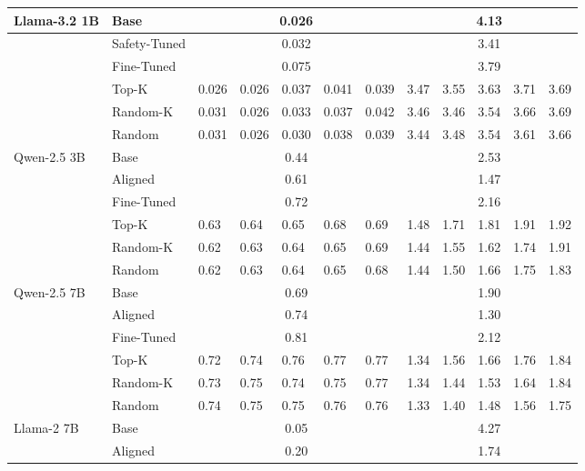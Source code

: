 \documentclass[10pt]{article}
\begin{document}
\begin{table}[h]
\begin{center}
\begin{tabular}{|l|l|l|l|l|l|l|l|l|l|l|l|}
\hline
\multirow{6}{*}{Llama-3.2 1B} & Base & \multicolumn{5}{|c|}{0.026} & \multicolumn{5}{|c|}{4.13} \\
\hline
 & Safety-Tuned & \multicolumn{5}{|c|}{0.032} & \multicolumn{5}{|c|}{3.41} \\
\hline
 & Fine-Tuned & \multicolumn{5}{|c|}{0.075} & \multicolumn{5}{|c|}{3.79} \\
\hline
 & Top-K & 0.026 & 0.026 & 0.037 & 0.041 & 0.039 & 3.47 & 3.55 & 3.63 & 3.71 & 3.69 \\
\hline
 & Random-K & 0.031 & 0.026 & 0.033 & 0.037 & 0.042 & 3.46 & 3.46 & 3.54 & 3.66 & 3.69 \\
\hline
 & Random & 0.031 & 0.026 & 0.030 & 0.038 & 0.039 & 3.44 & 3.48 & 3.54 & 3.61 & 3.66 \\
\hline
\multirow{6}{*}{Qwen-2.5 3B} & Base & \multicolumn{5}{|c|}{0.44} & \multicolumn{5}{|c|}{2.53} \\
\hline
 & Aligned & \multicolumn{5}{|c|}{0.61} & \multicolumn{5}{|c|}{1.47} \\
\hline
 & Fine-Tuned & \multicolumn{5}{|c|}{0.72} & \multicolumn{5}{|c|}{2.16} \\
\hline
 & Top-K & 0.63 & 0.64 & 0.65 & 0.68 & 0.69 & 1.48 & 1.71 & 1.81 & 1.91 & 1.92 \\
\hline
 & Random-K & 0.62 & 0.63 & 0.64 & 0.65 & 0.69 & 1.44 & 1.55 & 1.62 & 1.74 & 1.91 \\
\hline
 & Random & 0.62 & 0.63 & 0.64 & 0.65 & 0.68 & 1.44 & 1.50 & 1.66 & 1.75 & 1.83 \\
\hline
\multirow{6}{*}{Qwen-2.5 7B} & Base & \multicolumn{5}{|c|}{0.69} & \multicolumn{5}{|c|}{1.90} \\
\hline
 & Aligned & \multicolumn{5}{|c|}{0.74} & \multicolumn{5}{|c|}{1.30} \\
\hline
 & Fine-Tuned & \multicolumn{5}{|c|}{0.81} & \multicolumn{5}{|c|}{2.12} \\
\hline
 & Top-K & 0.72 & 0.74 & 0.76 & 0.77 & 0.77 & 1.34 & 1.56 & 1.66 & 1.76 & 1.84 \\
\hline
 & Random-K & 0.73 & 0.75 & 0.74 & 0.75 & 0.77 & 1.34 & 1.44 & 1.53 & 1.64 & 1.84 \\
\hline
 & Random & 0.74 & 0.75 & 0.75 & 0.76 & 0.76 & 1.33 & 1.40 & 1.48 & 1.56 & 1.75 \\
\hline
\multirow{6}{*}{Llama-2 7B} & Base & \multicolumn{5}{|c|}{0.05} & \multicolumn{5}{|c|}{4.27} \\
\hline
 & Aligned & \multicolumn{5}{|c|}{0.20} & \multicolumn{5}{|c|}{1.74} \\

\end{tabular}
\end{center}
\end{table}
\end{document}
